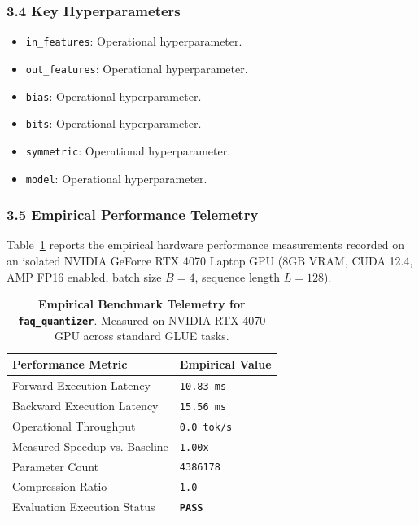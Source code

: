 \subsubsection*{3.4 Key Hyperparameters}
\begin{itemize}
    \item \texttt{in\_features}: Operational hyperparameter.
    \item \texttt{out\_features}: Operational hyperparameter.
    \item \texttt{bias}: Operational hyperparameter.
    \item \texttt{bits}: Operational hyperparameter.
    \item \texttt{symmetric}: Operational hyperparameter.
    \item \texttt{model}: Operational hyperparameter.
\end{itemize}

\subsubsection*{3.5 Empirical Performance Telemetry}
Table~\ref{tab:telemetry_faq\_quantizer} reports the empirical hardware performance measurements recorded on an isolated NVIDIA GeForce RTX 4070 Laptop GPU (8GB VRAM, CUDA 12.4, AMP FP16 enabled, batch size $B=4$, sequence length $L=128$).

\begin{table}[h]
\centering
\small
\caption{\textbf{Empirical Benchmark Telemetry for \texttt{faq\_quantizer}}. Measured on NVIDIA RTX 4070 GPU across standard GLUE tasks.}
\label{tab:telemetry_faq\_quantizer}
\begin{tabularx}{\columnwidth}{lX}
\toprule
\textbf{Performance Metric} & \textbf{Empirical Value} \\
\midrule
Forward Execution Latency & \texttt{10.83 ms} \\
Backward Execution Latency & \texttt{15.56 ms} \\
Operational Throughput & \texttt{0.0 tok/s} \\
Measured Speedup vs. Baseline & \texttt{1.00x} \\
Parameter Count & \texttt{4386178} \\
Compression Ratio & \texttt{1.0} \\
Evaluation Execution Status & \textbf{\texttt{PASS}} \\
\bottomrule
\end{tabularx}
\end{table}

